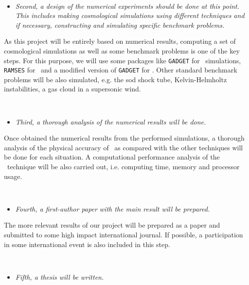 \documentclass[a4,useAMS,usenatbib,usegraphicx,12pt]{article}
\begin{document}
\

\begin{itemize}
\item[\checkmark] \textit{Second, a design of the numerical experiments should 
be done at this point. This includes making cosmological simulations using 
different techniques and if necessary, constructing and simulating specific 
benchmark problems.}
\end{itemize}


As this project will be entirely based on numerical results, computing a set of
cosmological simulations as well as some benchmark problems is one of the key 
steps. For this purpose, we will use some packages like \texttt{GADGET} 
\citet{Springel05} for \SPH\ simulations, \texttt{RAMSES} \citet{Teyssier02} 
for \AMR\ and a modified version of \texttt{GADGET} for \VPH. Other standard 
benchmark problems will be also simulated, e.g. the sod shock tube, 
Kelvin-Helmholtz instabilities, a gas cloud in a supersonic wind.

\

\begin{itemize}
\item[\checkmark] \textit{Third, a thorough analysis of the numerical results 
will be done.}
\end{itemize}


Once obtained the numerical results from the performed simulations, a thorough
analysis of the physical accuracy of \VPH\ as compared with the other techniques
will be done for each situation. A computational performance analysis of the 
\VPH\ technique will be also carried out, i.e. computing time, memory and 
processor usage.

\

\begin{itemize}
\item[\checkmark] \textit{Fourth, a first-author paper with the main result will
be prepared.}
\end{itemize}


The more relevant results of our project will be prepared as a paper and 
submitted to some high impact international journal. If possible, a participation
in some international event is also included in this step.

\

\begin{itemize}
\item[\checkmark] \textit{Fifth, a thesis will be written.}
\end{itemize}
\end{document}
